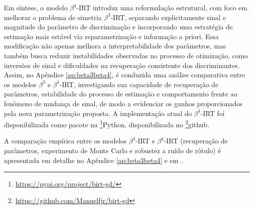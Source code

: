 Em síntese, o modelo $\beta^{4}$-\gls{IRT} introduz uma reformulação estrutural, com foco em melhorar o problema de simetria $\beta^{3}$-\gls{IRT}, separando explicitamente sinal e magnitude do parâmetro de discriminação e incorporando uma estratégia de estimação mais estável via reparametrização e informação a priori. Essa modificação não apenas melhora a interpretabilidade dos parâmetros, mas também busca reduzir instabilidades observadas no processo de otimização, como inversões de sinal e dificuldades na recuperação consistente dos discriminantes. Assim, no Apêndice \ref{ap:beta3beta4}, é conduzida uma análise comparativa entre os modelos $\beta^{3}$ e $\beta^{4}$-\gls{IRT}, investigando sua capacidade de recuperação de parâmetros, estabilidade do processo de estimação e comportamento frente ao fenômeno de mudança de sinal, de modo a evidenciar os ganhos proporcionados pela nova parametrização proposta. A implementação atual do $\beta^{4}$-\gls{IRT} foi disponibilizada como pacote na \footnote{\href{https://pypi.org/project/birt-gd/}{https://pypi.org/project/birt-gd/}}{Python}, disponibilizada no \footnote{\href{https://github.com/Manuelfjr/birt-gd}{https://github.com/Manuelfjr/birt-gd}}{github}.

A comparação empírica entre os modelos $\beta^3$-\gls{IRT} e $\beta^4$-\gls{IRT} (recuperação de parâmetros, experimento de Monte Carlo e robustez a ruído de rótulo) é apresentada em detalhe no Apêndice \ref{ap:beta3beta4} e em \cite{ferreirajunior2023beta4irtnewbeta3irtenhanced}.